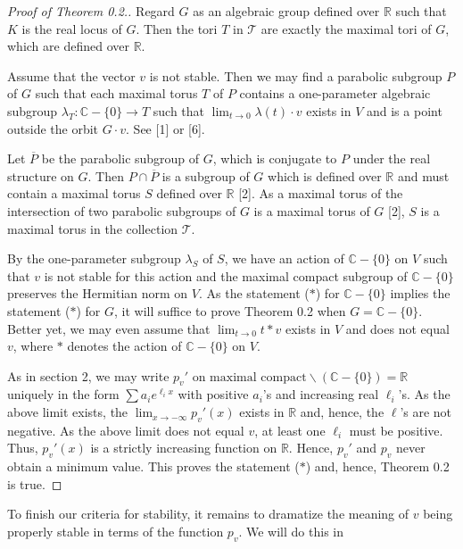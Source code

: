 \documentclass[11pt]{article}
\theoremstyle{plain}
\newcommand{\C}{\mathbb{C}}
\newcommand{\R}{\mathbb{R}}
\begin{document}
\begin{proof}[Proof of Theorem 0.2.]
Regard $G$ as an algebraic group defined over $\R$ such that $K$ is the real
locus of $G$. Then the tori $T$ in $\mathcal{T}$ are exactly the maximal tori of
$G$, which are defined over $\R$.

Assume that the vector $v$ is not stable. Then we may find a parabolic subgroup
$P$ of $G$ such that each maximal torus $T$ of $P$ contains a one-parameter
algebraic subgroup $\lambda_T:\C-\{0\}\to T$ such that
$\lim_{t\to 0}\lambda(t)\cdot v$ exists in $V$ and is a point outside the orbit
$G\cdot v$. See [1] or [6].

Let $\overline{P}$ be the parabolic subgroup of $G$, which is conjugate to $P$
under the real structure on $G$. Then $P\cap\overline{P}$ is a subgroup of $G$
which is defined over $\R$ and must contain a maximal torus $S$ defined over $\R$
[2]. As a maximal torus of the intersection of two parabolic subgroups of $G$ is
a maximal torus of $G$ [2], $S$ is a maximal torus in the collection
$\mathcal{T}$.

By the one-parameter subgroup $\lambda_S$ of $S$, we have an action of $\C-\{0\}$
on $V$ such that $v$ is not stable for this action and the maximal compact
subgroup of $\C-\{0\}$ preserves the Hermitian norm on $V$. As the statement
($*$) for $\C-\{0\}$ implies the statement ($*$) for $G$, it will suffice to
prove Theorem 0.2 when $G=\C-\{0\}$. Better yet, we may even assume that
$\lim_{t\to 0}t*v$ exists in $V$ and does not equal $v$, where $*$ denotes the
action of $\C-\{0\}$ on $V$.

As in section 2, we may write $p_v'$ on
$\text{maximal compact}\backslash(\C-\{0\})=\R$ uniquely
in the form $\sum a_i e^{\ell_i x}$ with positive $a_i$'s and increasing real
$\ell_i$'s. As the above limit exists, the $\lim_{x\to-\infty}p_v'(x)$ exists in
$\R$ and, hence, the $\ell$'s are not negative.
As the above limit does not equal $v$, at least one $\ell_i$ must be positive.
Thus, $p_v'(x)$ is a strictly increasing function on $\R$. Hence, $p_v'$ and
$p_v$ never obtain a minimum value. This proves the statement ($*$) and, hence,
Theorem 0.2 is true.
\end{proof}

To finish our criteria for stability, it remains to dramatize the meaning of $v$
being properly stable in terms of the function $p_v$. We will do this in
\end{document}
